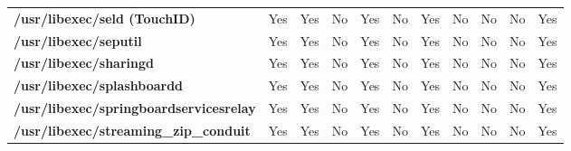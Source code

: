 \begin{center}
{\begin{tabular}{|>{\bfseries} l | C | C | C | C | C | C | C | C | C | C |}
					/usr/libexec/seld (TouchID) & Yes & Yes & \color{green}No & \color{red}Yes & \color{green}No & \color{red}Yes & No & No & \color{green}No & \color{red}Yes\\ 
					/usr/libexec/seputil & Yes & Yes & \color{green}No & \color{red}Yes & \color{green}No & \color{red}Yes & No & No & \color{green}No & \color{red}Yes\\ 
					/usr/libexec/sharingd & Yes & Yes & \color{green}No & \color{red}Yes & \color{green}No & \color{red}Yes & No & No & \color{green}No & \color{red}Yes\\ 
					/usr/libexec/splashboardd & Yes & Yes & \color{green}No & \color{red}Yes & \color{green}No & \color{red}Yes & No & No & \color{green}No & \color{red}Yes\\ 
					/usr/libexec/springboardservicesrelay & Yes & Yes & \color{green}No & \color{red}Yes & \color{green}No & \color{red}Yes & No & No & \color{green}No & \color{red}Yes\\ 
					/usr/libexec/streaming\_zip\_conduit & Yes & Yes & \color{green}No & \color{red}Yes & \color{green}No & \color{red}Yes & No & No & \color{green}No & \color{red}Yes\\ 

			\end{tabular}
		}
	\end{center}




